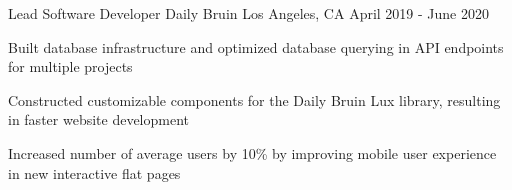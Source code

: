 \documentclass[12pt, letterpaper]{awesome-cv}
\begin{document}
\begin{cventries}
  \cventry
    {Lead Sof\/tware Developer} %
    {Daily Bruin} %
    {Los Angeles, CA} %
    {April 2019 - June 2020} %
    {
      \begin{cvitems} %
        \item {Built database infrastructure and optimized database querying in API endpoints for multiple projects}
		    \item {Constructed customizable components for the Daily Bruin Lux library, resulting in faster website development}
		    \item {Increased number of average users by 10\% by improving mobile user experience in new interactive flat pages}
      \end{cvitems}
    }

\end{cventries}
\end{document}
